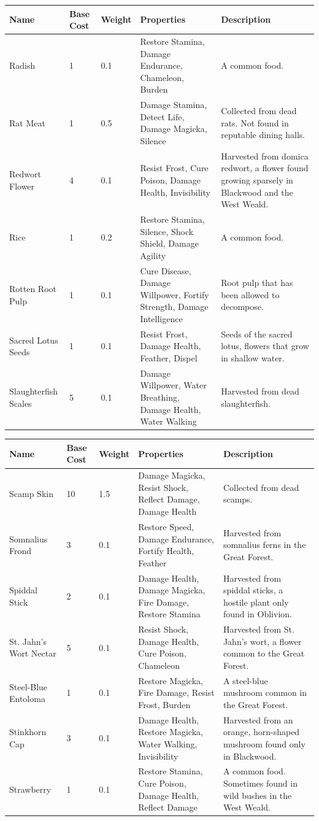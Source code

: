 \documentclass[12pt]{book}
\begin{document}
\begin{tabular}{|p{}|p{}|p{}|p{}|p{}|}
\hline
Name & Base Cost & Weight & Properties & Description\\ \hline
Radish & 1 & 0.1 & Restore Stamina, Damage Endurance, Chameleon, Burden & A common food.\\ \hline
Rat Meat & 1 & 0.5 & Damage Stamina, Detect Life, Damage Magicka, Silence & Collected from dead rats. Not found in reputable dining halls.\\ \hline
Redwort Flower & 4 & 0.1 & Resist Frost, Cure Poison, Damage Health, Invisibility & Harvested from domica redwort, a flower found growing sparsely in Blackwood and the West Weald.\\ \hline
Rice & 1 & 0.2 & Restore Stamina, Silence, Shock Shield, Damage Agility & A common food.\\ \hline
Rotten Root Pulp & 1 & 0.1 & Cure Disease, Damage Willpower, Fortify Strength, Damage Intelligence & Root pulp that has been allowed to decompose.\\ \hline
Sacred Lotus Seeds & 1 & 0.1 & Resist Frost, Damage Health, Feather, Dispel & Seeds of the sacred lotus, flowers that grow in shallow water.\\ \hline
Slaughterfish Scales & 5 & 0.1 & Damage Willpower, Water Breathing, Damage Health, Water Walking & Harvested from dead slaughterfish.\\ \hline
\end{tabular}

\begin{tabular}{|p{}|p{}|p{}|p{}|p{}|}
\hline
Name & Base Cost & Weight & Properties & Description\\ \hline
Scamp Skin & 10 & 1.5 & Damage Magicka, Resist Shock, Reflect Damage, Damage Health & Collected from dead scamps.\\ \hline
Somnalius Frond & 3 & 0.1 & Restore Speed, Damage Endurance, Fortify Health, Feather & Harvested from somnalius ferns in the Great Forest.\\ \hline
Spiddal Stick & 2 & 0.1 & Damage Health, Damage Magicka, Fire Damage, Restore Stamina & Harvested from spiddal sticks, a hostile plant only found in Oblivion.\\ \hline
St. Jahn's Wort Nectar & 5 & 0.1 & Resist Shock, Damage Health, Cure Poison, Chameleon & Harvested from St. Jahn's wort, a flower common to the Great Forest.\\ \hline
Steel-Blue Entoloma & 1 & 0.1 & Restore Magicka, Fire Damage, Resist Frost, Burden & A steel-blue mushroom common in the Great Forest.\\ \hline
Stinkhorn Cap & 3 & 0.1 & Damage Health, Restore Magicka, Water Walking, Invisibility & Harvested from an orange, horn-shaped mushroom found only in Blackwood.\\ \hline
Strawberry & 1 & 0.1 & Restore Stamina, Cure Poison, Damage Health, Reflect Damage & A common food. Sometimes found in wild bushes in the West Weald.\\ \hline
\end{tabular}
\end{document}

